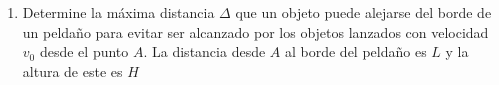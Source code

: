 \documentclass[letterpaper,11pt]{article}
\begin{document}
\begin{enumerate}
\item Determine la máxima distancia $\Delta$ que un objeto puede alejarse del borde de un peldaño para evitar ser alcanzado por los objetos lanzados con velocidad $v_0$ desde el punto $A$. La distancia desde $A$ al borde del peldaño es $L$ y la altura de este es $H$



%   

\end{enumerate}
\end{document}
